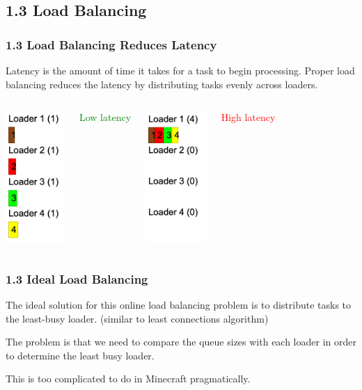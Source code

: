 \documentclass[aspectratio=169]{beamer}
\begin{document}
\subsection{1.3 Load Balancing}
\begin{frame}
	\frametitle{1.3 Load Balancing Reduces Latency}
    
    Latency is the amount of time it takes for a task to begin processing. Proper load balancing reduces the latency by distributing tasks evenly across loaders.

    \begin{columns}
        \centering
        \includegraphics[height=5cm]{latencygood.png}

        \textcolor{green}{Low latency}

        \centering
        \includegraphics[height=5cm]{latencybad.png}

        \textcolor{red}{High latency}
    \end{columns}
\end{frame}

\begin{frame}
	\frametitle{1.3 Ideal Load Balancing}
    
    The ideal solution for this online load balancing problem is to distribute tasks to the least-busy loader. (similar to least connections algorithm)

    The problem is that we need to compare the queue sizes with each loader in order to determine the least busy loader.

    This is too complicated to do in Minecraft pragmatically.
\end{frame}
\end{document}

